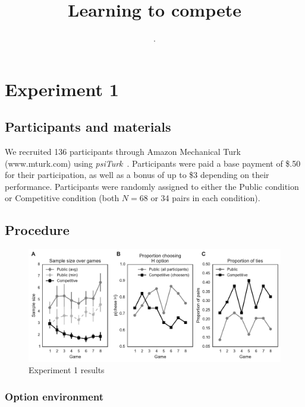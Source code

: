 \documentclass[11pt,jou]{apa6}
\title{Learning to compete}
\author{.}
\affiliation{.}
\begin{document}
\maketitle






\section{Experiment 1}

\subsection{Participants and materials}

We recruited 136 participants through Amazon Mechanical Turk (www.mturk.com) using \emph{psiTurk}~\cite{gureckis2015psiturk}.
Participants were paid a base payment of \$.50 for their participation, as well as a bonus of up to \$3 depending on their performance.
Participants were randomly assigned to either the Public condition or Competitive condition (both $N=68$ or 34 pairs in each condition).

\subsection{Procedure}

\begin{figure}[htbp]
\centerline{\includegraphics[width=5.5in]{figures/exp1_results.pdf}}
\caption{Experiment 1 results}
\label{exp1_results.fig}
\end{figure}

\subsubsection{Option environment}
\end{document}
